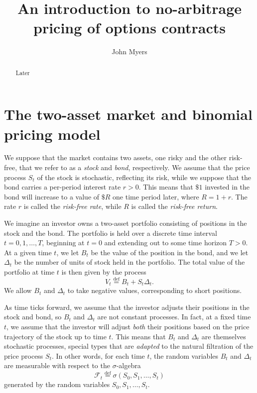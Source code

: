 \documentclass[reqno]{amsart}
\theoremstyle{definition}
\numberwithin{equation}{section}
\begin{document}
\title{An introduction to no-arbitrage pricing of options contracts}
\author{John Myers}

\begin{abstract}
Later
\end{abstract}

\maketitle

\tableofcontents

\section{The two-asset market and binomial pricing model}

We suppose that the market contains two assets, one risky and the other risk-free, that we refer to as a \textit{stock} and \textit{bond}, respectively. We assume that the price process $S_t$ of the stock is stochastic, reflecting its risk, while we suppose that the bond carries a per-period interest rate $r>0$. This means that $\$1$ invested in the bond will increase to a value of $\$R$ one time period later, where $R = 1+r$. The rate $r$ is called the \textit{risk-free rate}, while $R$ is called the \textit{risk-free return}.

We imagine an investor owns a two-asset portfolio consisting of positions in the stock and the bond. The portfolio is held over a discrete time interval $t=0,1,\ldots,T$, beginning at $t=0$ and extending out to some time horizon $T>0$. At a given time $t$, we let $B_t$ be the value of the position in the bond, and we let $\Delta_t$ be the number of units of stock held in the portfolio. The total value of the portfolio at time $t$ is then given by the process
	\[
	V_t \stackrel{\text{def}}{=} B_t + S_t \Delta_t.
	\]
We allow $B_t$ and $\Delta_t$ to take negative values, corresponding to short positions. 

As time ticks forward, we assume that the investor adjusts their positions in the stock and bond, so $B_t$ and $\Delta_t$ are not constant processes. In fact, at a fixed time $t$, we assume that the investor will adjust \textit{both} their positions based on the price trajectory of the stock up to time $t$. This means that $B_t$ and $\Delta_t$ are themselves stochastic processes, special types that are \textit{adapted} to the natural filtration of the price process $S_t$. In other words, for each time $t$, the random variables $B_t$ and $\Delta_t$ are measurable with respect to the $\sigma$-algebra
	\[
	\mathcal{F}_t \stackrel{\text{def}}{=} \sigma(S_0,S_1,\ldots,S_t)
	\]
generated by the random variables $S_0,S_1,\ldots,S_t$.
\end{document}
